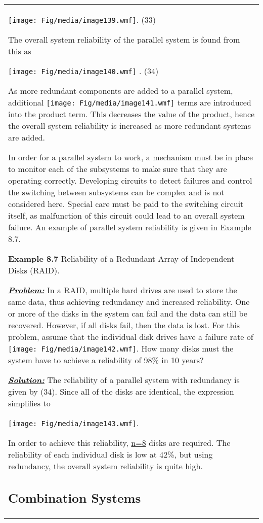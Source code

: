 \begin{table}
\begin{tabular}{m{15cm}|}
\texttt{[image: Fig/media/image139.wmf]}.
(33)

The overall system reliability of the parallel system is found from this
as

\texttt{[image: Fig/media/image140.wmf]} . (34)

As more redundant components are added to a parallel system, additional
\texttt{[image: Fig/media/image141.wmf]} terms are introduced into the
product term. This decreases the value of the product, hence the overall
system reliability is increased as more redundant systems are added.

In order for a parallel system to work, a mechanism must be in place to
monitor each of the subsystems to make sure that they are operating
correctly. Developing circuits to detect failures and control the
switching between subsystems can be complex and is not considered here.
Special care must be paid to the switching circuit itself, as
malfunction of this circuit could lead to an overall system failure. An
example of parallel system reliability is given in Example 8.7.

\textbf{Example 8.7} Reliability of a Redundant Array of Independent
Disks (RAID).

\emph{\textbf{\ul{Problem:}}} In a RAID, multiple hard drives are used
to store the same data, thus achieving redundancy and increased
reliability. One or more of the disks in the system can fail and the
data can still be recovered. However, if all disks fail, then the data
is lost. For this problem, assume that the individual disk drives have a
failure rate of \texttt{[image: Fig/media/image142.wmf]}. How many disks
must the system have to achieve a reliability of 98\% in 10 years?

\emph{\textbf{\ul{Solution:}}} The reliability of a parallel system with
redundancy is given by (34). Since all of the disks are identical, the
expression simplifies to

\texttt{[image: Fig/media/image143.wmf]}.

In order to achieve this reliability, \ul{n=8} disks are required. The
reliability of each individual disk is low at 42\%, but using
redundancy, the overall system reliability is quite high.

\subsection{Combination Systems}\label{combination-systems}


\end{tabular}
\end{table}

